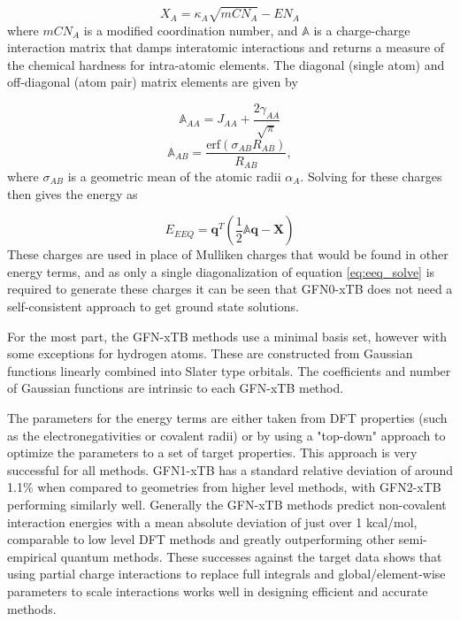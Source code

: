 \begin{equation}
    X_A = \kappa_A \sqrt{mCN_A} - EN_A
\end{equation}
%
where $mCN_A$ is a modified coordination number, and $\mathbb{A}$ is a charge-charge
interaction matrix that damps interatomic interactions and returns a measure of 
the chemical hardness for intra-atomic elements. The diagonal (single atom) and 
off-diagonal (atom pair) matrix elements are given by

\begin{equation}
    \mathbb{A}_{AA} = J_{AA} + \frac{2\gamma_{AA}}{\sqrt{\pi}}
\end{equation}
%
\begin{equation}
    \mathbb{A}_{AB} = \frac{\text{erf}\left(\sigma_{AB} R_{AB}\right)}{R_{AB}},
\end{equation}
%
where $\sigma_{AB}$ is a geometric mean of the atomic radii $\alpha_A$. Solving 
for these charges then gives the energy as 

\begin{equation}
    E_{EEQ} = \mathbf{q}^T \left(\frac{1}{2}\mathbb{A}\mathbf{q} - \mathbf{X}\right)
\end{equation}
%
These charges are used in place of Mulliken charges that would be found in other
energy terms, and as only a single diagonalization of equation \ref{eq:eeq_solve} 
is required to generate these charges it can be seen that GFN0-xTB does not need
a self-consistent approach to get ground state solutions.

For the most part, the GFN-xTB methods use a minimal basis set, however with some
exceptions for hydrogen atoms. These are constructed from Gaussian functions linearly
combined into Slater type orbitals. The coefficients and number of Gaussian functions
are intrinsic to each GFN-xTB method.

The parameters for the energy terms are either taken from DFT properties (such
as the electronegativities or covalent radii) or by using a "top-down" approach
to optimize the parameters to a set of target properties. This approach is very 
successful for all methods. GFN1-xTB  has a standard relative deviation of around
1.1\% when compared to geometries from higher level methods, with GFN2-xTB performing
similarly well. Generally the GFN-xTB methods predict non-covalent interaction energies
with a mean absolute deviation of just over 1 kcal/mol, comparable to low level 
DFT methods and greatly outperforming other semi-empirical quantum methods. These
successes against the target data shows that using partial charge interactions to
replace full integrals and global/element-wise parameters to scale interactions 
works well in designing efficient and accurate methods.

